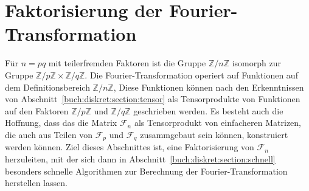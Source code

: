 %
%
%
\section{Faktorisierung der Fourier-Transformation
\label{buch:diskret:section:vandermonde}}
Für $n=pq$ mit teilerfremden Faktoren ist die Gruppe
$\mathbb{Z}/n\mathbb{Z}$ isomorph zur Gruppe
$\mathbb{Z}/p\mathbb{Z}\times \mathbb{Z}/q\mathbb{Z}$.
Die Fourier-Transformation operiert auf Funktionen auf
dem Definitionsbereich $\mathbb{Z}/n\mathbb{Z}$,
Diese Funktionen können nach den Erkenntnissen von
Abschnitt~\ref{buch:diskret:section:tensor} als Tensorprodukte
von Funktionen auf den Faktoren $\mathbb{Z}/p\mathbb{Z}$
und $\mathbb{Z}/q\mathbb{Z}$ geschrieben werden.
Es besteht auch die Hoffnung, dass das die Matrix $\mathscr{F}_n$
als Tensorprodukt von einfacheren Matrizen, die auch aus Teilen von 
$\mathscr{F}_p$ und $\mathscr{F}_q$ zusammgebaut sein können,
konstruiert werden können.
Ziel dieses Abschnittes ist, eine Faktorisierung von $\mathscr{F}_n$
herzuleiten, mit der sich dann in
Abschnitt~\ref{buch:diskret:section:schnell}
besonders schnelle Algorithmen zur Berechnung der Fourier-Transformation
herstellen lassen.








